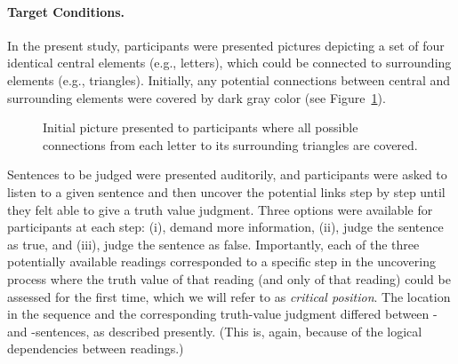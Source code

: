 \documentclass[fleqn,reqno,10pt,draft]{article}
\newcommand{\as}{\acro{as}}
\renewcommand{\es}{\acro{es}}
\begin{document}
\paragraph{Target Conditions.} In the present study, participants were 
presented pictures
depicting a set of four identical central elements
(e.g., letters), which could be connected to surrounding elements
(e.g., triangles). Initially, any potential connections between
central and surrounding elements were covered by dark gray color (see
Figure~\ref{fig:InitialPicture}).
%
\begin{figure}
  \centering
      \caption{Initial picture presented to participants where all
        possible connections from each letter to its surrounding
        triangles are covered.}
  \label{fig:InitialPicture}
\end{figure}
%
Sentences to be judged 
were presented auditorily, and participants were
asked to listen to a given sentence and then uncover the potential
links step by step until they felt able to give a truth value
judgment. Three options were available for participants at each step:
(i), demand more information, (ii), judge the sentence as true, and
(iii), judge the sentence as false. Importantly, each of the three
potentially available readings corresponded to a specific step in the
uncovering process where the truth value of that reading (and only of
that reading) could be assessed for the first time, which we will
refer to as {\it critical position}. The location in the sequence and 
the corresponding truth-value judgment differed between \as- and 
\es-sentences, as described presently. (This is, again, because of the 
logical dependencies between readings.)
\end{document}
